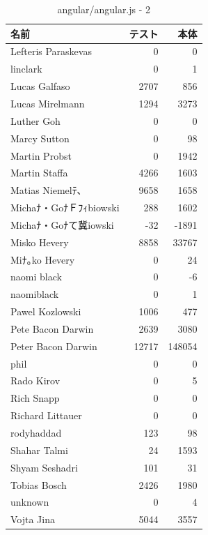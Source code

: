 \begin{table}[htb]
\begin{center}
\caption{angular/angular.js - 2}
\begin{tabular}{|l|r|r|} \hline 
名前 & テスト & 本体 \\ \hline \hline
Lefteris Paraskevas & 0 & 0 \\ \hline
linclark & 0 & 1 \\ \hline
Lucas Galfaso & 2707 & 856 \\ \hline
Lucas Mirelmann & 1294 & 3273 \\ \hline
Luther Goh & 0 & 0 \\ \hline
Marcy Sutton & 0 & 98 \\ \hline
Martin Probst & 0 & 1942 \\ \hline
Martin Staffa & 4266 & 1603 \\ \hline
Matias Niemelﾃ､ & 9658 & 1658 \\ \hline
Michaﾅ・GoﾅＦﾌｨbiowski & 288 & 1602 \\ \hline
Michaﾅ・Goﾅて冀iowski & -32 & -1891 \\ \hline
Misko Hevery & 8858 & 33767 \\ \hline
Miﾅ｡ko Hevery & 0 & 24 \\ \hline
naomi black & 0 & -6 \\ \hline
naomiblack & 0 & 1 \\ \hline
Pawel Kozlowski & 1006 & 477 \\ \hline
Pete Bacon Darwin & 2639 & 3080 \\ \hline
Peter Bacon Darwin & 12717 & 148054 \\ \hline
phil & 0 & 0 \\ \hline
Rado Kirov & 0 & 5 \\ \hline
Rich Snapp & 0 & 0 \\ \hline
Richard Littauer & 0 & 0 \\ \hline
rodyhaddad & 123 & 98 \\ \hline
Shahar Talmi & 24 & 1593 \\ \hline
Shyam Seshadri & 101 & 31 \\ \hline
Tobias Bosch & 2426 & 1980 \\ \hline
unknown & 0 & 4 \\ \hline
Vojta Jina & 5044 & 3557 \\ \hline
\end{tabular}
\end{center}
\end{table}

